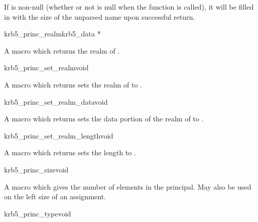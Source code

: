 If  is non-null (whether or not  is
null when the function is called), it will be filled in with the size
of the unparsed name upon successful return.

\begin{funcdecl}{krb5_princ_realm}{krb5_data *}{\funcinout}
\end{funcdecl}

A macro which returns the realm of .

\begin{funcdecl}{krb5_princ_set_realm}{void}{\funcinout}
\end{funcdecl}

A macro which returns sets the realm of  to
. 

\begin{funcdecl}{krb5_princ_set_realm_data}{void}{\funcinout}
\end{funcdecl}

\internalfunc

A macro which returns sets the data portion of the realm of
 to . 

\begin{funcdecl}{krb5_princ_set_realm_length}{void}{\funcinout}
\end{funcdecl}

\internalfunc

A macro which returns sets the length  to
. 

\begin{funcdecl}{krb5_princ_size}{void}{\funcinout}
\end{funcdecl}

\internalfunc

A macro which gives the number of elements in the principal.
May also be used on the left size of an assignment.

\begin{funcdecl}{krb5_princ_type}{void}{\funcinout}
\end{funcdecl}

